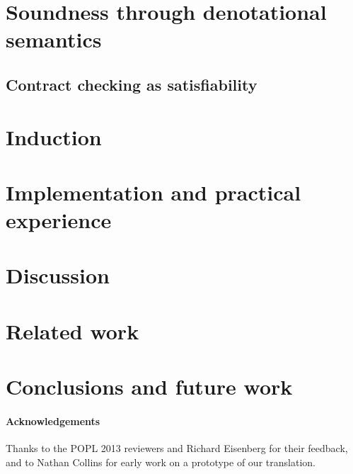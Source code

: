 \documentclass[preprint,nocopyrightspace]{sigplanconf}
\begin{document}
\section{Soundness through denotational semantics}
   \label{sect:contracts}\label{ssect:denot}
  

\subsection{Contract checking as satisfiability}\label{sect:soundness}
  

\section{Induction}\label{sect:extensions}
  

\section{Implementation and practical experience}\label{sect:implementation}
  

\section{Discussion}\label{sect:discussion}
  

\section{Related work}\label{sect:related}
   


\section{Conclusions and future work}\label{sect:future}
  

\paragraph{Acknowledgements}
Thanks to the POPL 2013 reviewers and Richard Eisenberg for their feedback,
and to Nathan Collins for early work on a prototype of our translation.




\appendix 

\end{document}
